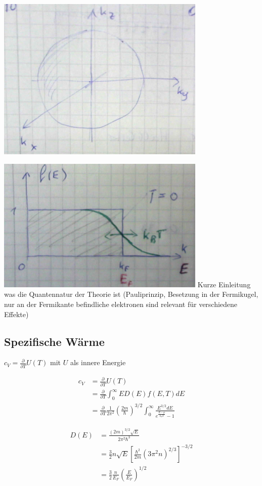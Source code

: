 \includegraphics[width=0.75\textwidth]{kap06_27.png}


\includegraphics[width=0.75\textwidth]{kap06_28.png}
Kurze Einleitung was die Quantennatur der Theorie ist (Pauliprinzip, Besetzung in der Fermikugel, nur an der Fermikante befindliche elektronen sind relevant für verschiedene Effekte)

\subsection{Spezifische Wärme}

\(c_V = \frac{\partial }{\partial T}U(T)\) mit \(U\) als innere Energie

\begin{align}
c_V &= \frac{\partial }{\partial T}U(T)\\
&= \frac{\partial }{\partial T}\int_0^\infty ED(E)f(E,T)dE\\
&=\frac{\partial }{\partial T}\frac{1}{2\pi^2}\left(\frac{2m}{\hbar}\right)^{3/2}\int_0^\infty\frac{E^{3/2}dE}{e^{\frac{E-\mu}{k_BT}}-1}
\end{align}

\begin{align}
D(E)&=\frac{(2m)^{3/2}\sqrt{E}}{2\pi^2\hbar^3}\\
&=\frac{3}{2}n\sqrt{E}\left[\frac{\hbar^2}{2m}(3\pi^2 n)^{2/3}\right]^{-3/2}\\
&= \frac{3}{2}\frac{n}{E_F}\left(\frac{E}{E_F}\right)^{1/2}
\end{align}


